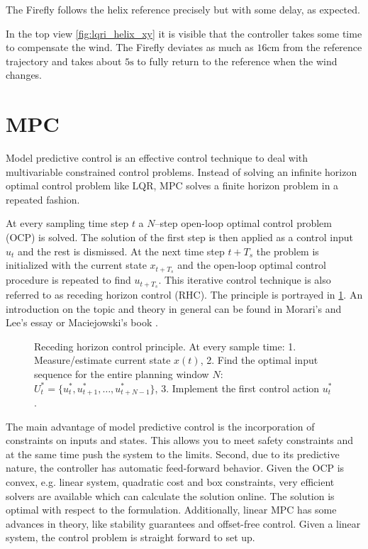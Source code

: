 The Firefly follows the helix reference precisely but with some delay, as expected.

In the top view \ref{fig:lqri_helix_xy} it is visible that the controller takes some time to compensate the wind. The Firefly deviates as much as $16 \si{\centi\metre}$ from the reference trajectory and takes about $5 \si{\second}$ to fully return to the reference when the wind changes.
\section{MPC} 
Model predictive control is an effective control technique to deal with multivariable constrained control problems. Instead of solving an infinite horizon optimal control problem like LQR, MPC solves a finite horizon problem in a repeated fashion. 

At every sampling time step $t$ a $N$--step open-loop optimal control problem (OCP) is solved. The solution of the first step is then applied as a control input $u_t$ and the rest is dismissed. At the next time step $t+T_s$ the problem is initialized with the current state $x_{t+T_s}$ and the open-loop optimal control procedure is repeated to find $u_{t+T_s}$. This iterative control technique is also referred to as receding horizon control (RHC). The principle is portrayed in \ref{fig:rhc}.  An introduction on the topic and theory in general can be found in Morari's and Lee's essay \cite{Morari1999} or Maciejowski's book \cite{Maciejowski2002}.
\begin{figure}
\centering

\caption{Receding horizon control principle. At every sample time: 1. Measure/estimate current state $x(t)$, 2. Find the optimal input sequence for the entire planning window $N$: $U_t^* = \{ u_t^*, u_{t+1}^*, \ldots, u_{t+N-1}^* \}$, 3. Implement the first control action $u_t^*$.}
\label{fig:rhc}
\end{figure}

The main advantage of model predictive control is the incorporation of constraints on inputs and states. This allows you to meet safety constraints and at the same time push the system to the limits. Second, due to its predictive nature, the controller has automatic feed-forward behavior. Given the OCP is convex, e.g. linear system, quadratic cost and box constraints, very efficient solvers are available which can calculate the solution online. The solution is optimal with respect to the formulation. Additionally, linear MPC has some advances in theory, like stability guarantees and offset-free control. Given a linear system, the control problem is straight forward to set up.


